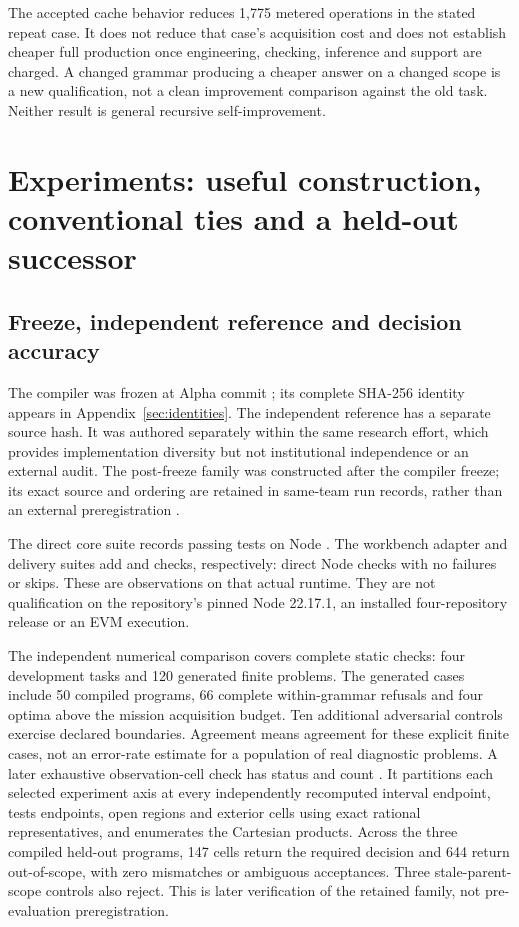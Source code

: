 \documentclass[11pt,letterpaper]{article}
\theoremstyle{definition}\newtheorem{definition}[theorem]{Definition}
\theoremstyle{remark}\newtheorem{remark}[theorem]{Remark}
\begin{document}
The accepted cache behavior reduces 1,775 metered operations in the stated repeat case. It does not reduce that case's acquisition cost and does not establish cheaper full production once engineering, checking, inference and support are charged. A changed grammar producing a cheaper answer on a changed scope is a new qualification, not a clean improvement comparison against the old task. Neither result is general recursive self-improvement.

\section{Experiments: useful construction, conventional ties and a held-out successor}
\label{sec:experiments}
\subsection{Freeze, independent reference and decision accuracy}
The compiler was frozen at Alpha commit \texttt{\CoreShortRevision}; its complete SHA-256 identity appears in Appendix~\ref{sec:identities}. The independent reference has a separate source hash. It was authored separately within the same research effort, which provides implementation diversity but not institutional independence or an external audit. The post-freeze family was constructed after the compiler freeze; its exact source and ordering are retained in same-team run records, rather than an external preregistration \citep{compiler,run}.

The direct core suite records \CoreTests{} passing tests on Node \ObservedNodeVersion. The workbench adapter and delivery suites add \AdapterTests{} and \DeliveryTests{} checks, respectively: \TotalNodeTests{} direct Node checks with no failures or skips. These are observations on that actual runtime. They are not qualification on the repository's pinned Node 22.17.1, an installed four-repository release or an EVM execution.

The independent numerical comparison covers \ReferenceCases{} complete static checks: four development tasks and 120 generated finite problems. The generated cases include 50 compiled programs, 66 complete within-grammar refusals and four optima above the mission acquisition budget. Ten additional adversarial controls exercise declared boundaries. Agreement means agreement for these explicit finite cases, not an error-rate estimate for a population of real diagnostic problems. A later exhaustive observation-cell check has status \ObservationCellStatus{} and count \ObservationCellCount{}. It partitions each selected experiment axis at every independently recomputed interval endpoint, tests endpoints, open regions and exterior cells using exact rational representatives, and enumerates the Cartesian products. Across the three compiled held-out programs, 147 cells return the required decision and 644 return out-of-scope, with zero mismatches or ambiguous acceptances. Three stale-parent-scope controls also reject. This is later verification of the retained family, not pre-evaluation preregistration.
\end{document}
